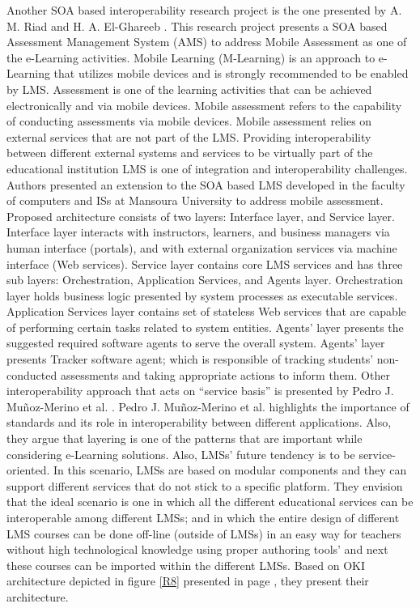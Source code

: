 \documentclass[12pt,a4paper,final,twoside,onecolumn,titlepage]{book}
\begin{document}
Another \gls{SOA} based interoperability research project is the one presented by A. M. Riad and H. A. El-Ghareeb \cite{EV10}. This research project presents a \gls{SOA} based Assessment Management System (AMS) to address Mobile Assessment as one of the e-Learning activities. Mobile Learning (M-Learning) is an approach to e-Learning that utilizes mobile devices and is strongly recommended to be enabled by \gls{LMS}. Assessment is one of the learning activities that can be achieved electronically and via mobile devices. Mobile assessment refers to the capability of conducting assessments via mobile devices. Mobile assessment relies on external services that are not part of the \gls{LMS}. Providing interoperability between different external systems and services to be virtually part of the educational institution \gls{LMS} is one of integration and interoperability challenges. Authors presented an extension to the \gls{SOA} based \gls{LMS} developed in the faculty of computers and \gls{IS}s at Mansoura University to address mobile assessment. Proposed architecture consists of two layers: Interface layer, and Service layer. Interface layer interacts with instructors, learners, and business managers via human interface (portals), and with external organization services via machine interface (Web services). Service layer contains core \gls{LMS} services and has three sub layers: Orchestration, Application Services, and Agents layer. Orchestration layer holds business logic presented by system processes as executable services. Application Services layer contains set of stateless Web services that are capable of performing certain tasks related to system entities. Agents’ layer presents the suggested required software agents to serve the overall system. Agents’ layer presents Tracker software agent; which is responsible of tracking students’ non-conducted assessments and taking appropriate actions to inform them.
Other interoperability approach that acts on “service basis” is presented by Pedro J. Muñoz-Merino et al. \cite{R66}. Pedro J. Muñoz-Merino et al. highlights the importance of standards and its role in interoperability between different applications. Also, they argue that layering is one of the patterns that are important while considering e-Learning solutions. Also, \gls{LMS}s’ future tendency is to be service-oriented. In this scenario, \gls{LMS}s are based on modular components and they can support different services that do not stick to a specific platform. They envision that the ideal scenario is one in which all the different educational services can be interoperable among different \gls{LMS}s; and in which the entire design of different \gls{LMS} courses can be done off-line (outside of \gls{LMS}s) in an easy way for teachers without high technological knowledge using proper authoring tools’ and next these courses can be imported within the different \gls{LMS}s. Based on \gls{OKI}  architecture depicted in figure \ref{R8} presented in page \pageref{R8}, they present their architecture.
\end{document}
